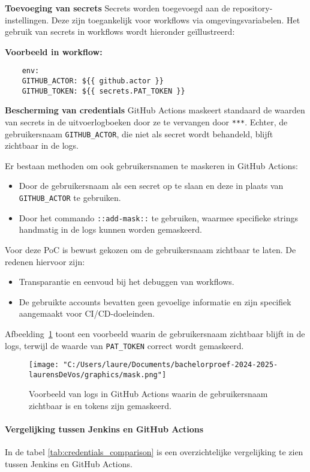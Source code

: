\textbf{Toevoeging van secrets}  
Secrets worden toegevoegd aan de repository-instellingen. Deze zijn toegankelijk voor workflows via omgevingsvariabelen. Het gebruik van secrets in workflows wordt hieronder geïllustreerd:

\textbf{Voorbeeld in workflow:}
\begin{verbatim}
    env:
    GITHUB_ACTOR: ${{ github.actor }}
    GITHUB_TOKEN: ${{ secrets.PAT_TOKEN }}
\end{verbatim}

\textbf{Bescherming van credentials}  
GitHub Actions maskeert standaard de waarden van secrets in de uitvoerlogboeken door ze te vervangen door \texttt{***}. Echter, de gebruikersnaam \texttt{GITHUB\_ACTOR}, die niet als secret wordt behandeld, blijft zichtbaar in de logs. 

Er bestaan methoden om ook gebruikersnamen te maskeren in GitHub Actions:
\begin{itemize}
    \item Door de gebruikersnaam als een secret op te slaan en deze in plaats van \texttt{GITHUB\_ACTOR} te gebruiken.
    \item Door het commando \texttt{::add-mask::} te gebruiken, waarmee specifieke strings handmatig in de logs kunnen worden gemaskeerd.
\end{itemize}

Voor deze PoC is bewust gekozen om de gebruikersnaam zichtbaar te laten. De redenen hiervoor zijn:
\begin{itemize}
    \item Transparantie en eenvoud bij het debuggen van workflows.
    \item De gebruikte accounts bevatten geen gevoelige informatie en zijn specifiek aangemaakt voor CI/CD-doeleinden.
\end{itemize}

Afbeelding~\ref{fig:github_logs_actor} toont een voorbeeld waarin de gebruikersnaam zichtbaar blijft in de logs, terwijl de waarde van \texttt{PAT\_TOKEN} correct wordt gemaskeerd.

\begin{figure}[h!]
    \centering
    \texttt{[image: "C:/Users/laure/Documents/bachelorproef-2024-2025-laurensDeVos/graphics/mask.png"]}
    \caption{Voorbeeld van logs in GitHub Actions waarin de gebruikersnaam zichtbaar is en tokens zijn gemaskeerd.}
    \label{fig:github_logs_actor}
\end{figure}

\paragraph{Vergelijking tussen Jenkins en GitHub Actions}
In de tabel \ref{tab:credentials_comparison} is een overzichtelijke vergelijking te zien tussen Jenkins en GitHub Actions.

